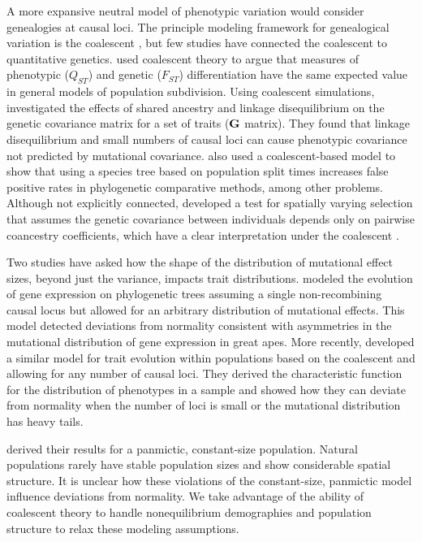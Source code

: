 A more expansive neutral model of phenotypic variation would consider
genealogies at causal loci. The principle modeling framework for genealogical
variation is the coalescent \citep{Wakeley2008}, but few studies have connected
the coalescent to quantitative genetics. \citet{Whitlock1999} used coalescent
theory to argue that measures of phenotypic ($Q_{ST}$) and genetic ($F_{ST}$)
differentiation have the same expected value in general models of population
subdivision. Using coalescent simulations, \citet{Griswold2007} investigated the
effects of shared ancestry and linkage disequilibrium on the genetic covariance
matrix for a set of traits ($\mbox{\textbf{G}}$ matrix). They found that linkage
disequilibrium and small numbers of causal loci can cause phenotypic covariance
not predicted by mutational covariance. \citet{Mendes2018} also used a
coalescent-based model to show that using a species tree based on population
split times increases false positive rates in phylogenetic comparative methods,
among other problems. Although not explicitly connected, \citet{Ovaskainen2011}
developed a test for spatially varying selection that assumes the genetic
covariance between individuals depends only on pairwise coancestry coefficients,
which have a clear interpretation under the coalescent \citep{Slatkin1991}.

Two studies have asked how the shape of the distribution of mutational effect
sizes, beyond just the variance, impacts trait
distributions. \citet{Khaitovich2005} modeled the evolution of gene expression
on phylogenetic trees assuming a single non-recombining causal locus but allowed
for an arbitrary distribution of mutational effects. This model detected
deviations from normality consistent with asymmetries in the mutational
distribution of gene expression in great apes. More
recently, \citet{Schraiber2015} developed a similar model for trait evolution
within populations based on the coalescent and allowing for any number of causal
loci. They derived the characteristic function for the distribution of
phenotypes in a sample and showed how they can deviate from normality when the
number of loci is small or the mutational distribution has heavy tails.

\citet{Schraiber2015} derived their results for a panmictic, constant-size
population. Natural populations rarely have stable population sizes and show
considerable spatial structure. It is unclear how these violations of the
constant-size, panmictic model influence deviations from normality. We take
advantage of the ability of coalescent theory to handle nonequilibrium
demographies and population structure to relax these modeling assumptions.

